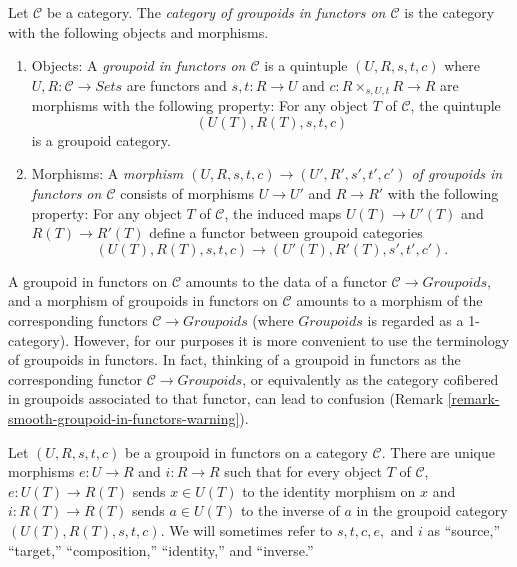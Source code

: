 \begin{definition}
\label{definition-groupoid-in-functors}
Let $\mathcal{C}$ be a category. The {\it category of groupoids in functors on 
$\mathcal{C}$} is the category with the following objects and morphisms.
\begin{enumerate}
\item Objects: A {\it groupoid in functors on $\mathcal{C}$} is a quintuple 
$(U,R,s,t,c)$ where $U,R: \mathcal{C} \to \textit{Sets}$ are 
functors and $s,t: R \to U$ and $c: R \times_{s,U,t} R \to R$ 
are morphisms with the following property: For any object $T$ of $\mathcal{C}$, 
the quintuple
\[ (U(T), R(T), s,t,c) \]
is a groupoid category.
\item Morphisms: A {\it morphism $(U,R,s,t,c) \to (U',R',s',t',c')$ of 
groupoids in functors on $\mathcal{C}$} consists of morphisms $U \to U'$ 
and $R \to R'$ with the following property: For any object $T$ of 
$\mathcal{C}$, the induced maps $U(T) \to U'(T)$ and $R(T) \to 
R'(T)$ define a functor between groupoid categories
\[ (U(T), R(T), s,t,c) \to (U'(T), R'(T), s',t',c') .\] 
\end{enumerate}
\end{definition}

\begin{remark}
\label{remark-confusion-groupoids-in-functors}
A groupoid in functors on $\mathcal{C}$ amounts to the data of a functor $ 
\mathcal{C} \to \textit{Groupoids}$, and a morphism of groupoids 
in functors on $\mathcal{C}$ amounts to a morphism of the corresponding
functors 
$\mathcal{C} \to \textit{Groupoids}$ (where 
$\textit{Groupoids}$ is regarded as a 1-category).  However, for our 
purposes it is more convenient to use the terminology of groupoids in functors. 
 In fact, thinking of a groupoid in functors as the corresponding functor 
$\mathcal{C} \to \textit{Groupoids}$, or equivalently as the 
category cofibered in groupoids associated to that functor, can lead to 
confusion (Remark \ref{remark-smooth-groupoid-in-functors-warning}).
\end{remark}

\begin{remark}
\label{remark-identity-inverse}
Let $(U,R,s,t,c)$ be a groupoid in functors on a category $\mathcal{C}$. There 
are unique morphisms $e: U \to R$ and $i: R \to R$ such that 
for every object $T$ of $\mathcal{C}$, $e: U(T) \to R(T)$ sends $x \in 
U(T)$ to the identity morphism on $x$ and $i: R(T) \to R(T)$ sends $a 
\in U(T)$ to the inverse of $a$ in the groupoid category $(U(T),R(T),s,t,c)$. 
We will sometimes refer to $s,t,c,e,$ and $i$ as ``source,'' ``target,'' 
``composition,'' ``identity,'' and ``inverse.''
\end{remark}

